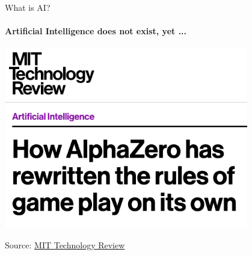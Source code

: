 \begin{frame}{What is AI?}
  \framesubtitle{Artificial Intelligence does not exist, yet ...}
  \includegraphics[width=0.8\textwidth]{graphics/alpha_go}

  Source: \href{https://www.technologyreview.com/s/612923/how-alphazero-has-rewritten-the-rules-of-gameplay-on-its-own/}{MIT Technology Review}
\end{frame}

